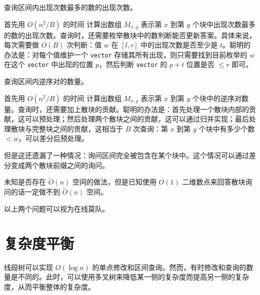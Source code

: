\begin{example}[区间众数]
    查询区间内出现次数最多的数的出现次数。
\end{example}
\begin{solution}
    首先用 $O(n^2/B)$ 的时间 计算出数组 $M_{x,y}$ 表示第 $x$ 到第 $y$ 个块中出现次数最多的数的出现次数。查询时，还需要枚举散块中的数判断能否更新答案。具体来说，每次需要做 $O(B)$ 次判断：值 $w$ 在 $[l,r]$ 中的出现次数是否至少是 $t$。聪明的办法是：对每个值维护一个 \texttt{vector} 存储其所有出现，则只需要找到目前枚举的 $w$ 在这个 \texttt{vector} 中出现的位置 $p$，然后判断 \texttt{vector} 的 $p+t$ 位置是否 $\le r$ 即可。
\end{solution}

\begin{example}[区间逆序对]
    查询区间内逆序对的数量。
\end{example}
\begin{solution}
    首先用 $O(n^2/B)$ 的时间 计算出数组 $M_{x,y}$ 表示第 $x$ 到第 $y$ 个块中的逆序对数量。查询时，还需要加上散块的贡献。聪明的办法是：首先处理一个散块内部的贡献，这可以预处理；然后处理两个散块之间的贡献，这可以通过归并实现；最后处理散块与完整块之间的贡献，这相当于 $B$ 次查询：第 $x$ 到第 $y$ 个块中有多少个数 $<w$，可以差分后预处理。

    但是这还遗漏了一种情况：询问区间完全被包含在某个块中。这个情况可以通过差分变成两个散块前缀之间的询问。
\end{solution}
\begin{remark}
    未知是否存在 $\tilde O(n)$ 空间的做法，但是已知使用 $O(1)$ 二维数点来回答散块询问的话一定做不到 $\tilde O(n)$ 空间。
\end{remark}
\begin{remark}
    以上两个问题可以视为在线莫队。
\end{remark}


\section{复杂度平衡}

线段树可以实现 $O(\log n)$ 的单点修改和区间查询。然而，有时修改和查询的数量是不同的。此时，可以使用多叉树来降低某一侧的复杂度而提高另一侧的复杂度，从而平衡整体的复杂度。

